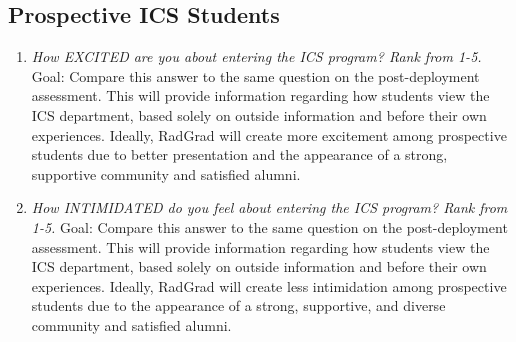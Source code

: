 \subsection{Prospective ICS Students}
\begin{enumerate}
\item\textit{ How EXCITED are you about entering the ICS program? Rank from 1-5.}
Goal: Compare this answer to the same question on the post-deployment assessment.  This will provide information regarding how students view the ICS department, based solely on outside information and before their own experiences. Ideally, RadGrad will create more excitement among prospective students due to better presentation and the appearance of a strong, supportive community and satisfied alumni.
\item \textit{How INTIMIDATED do you feel about entering the ICS program? Rank from 1-5.}
Goal: Compare this answer to the same question on the post-deployment assessment.  This will provide information regarding how students view the ICS department, based solely on outside information and before their own experiences. Ideally, RadGrad will create less intimidation among prospective students due to the appearance of a strong, supportive, and diverse community and satisfied alumni. 
\end{enumerate}

